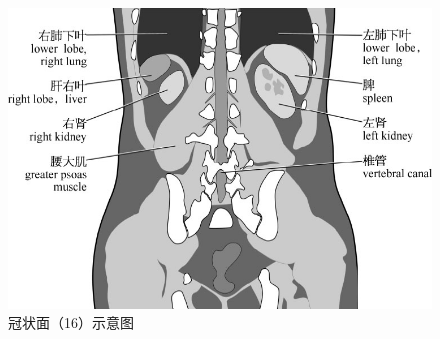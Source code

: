\begin{figure}[!htbp]
 \centering
 \includegraphics{./images/Image00139.jpg}
 \captionsetup{justification=centering}
 \caption{冠状面（16）示意图}
  \end{figure} 
 \FloatBarrier
